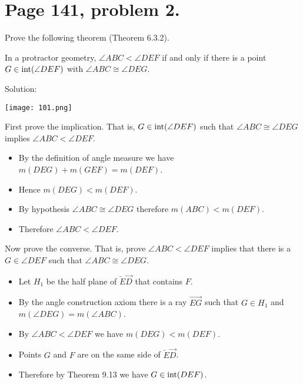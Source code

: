 \documentclass[12pt,openany]{report}
\begin{document}
\section*{Page 141, problem 2.}

Prove the following theorem (Theorem 6.3.2).

\medskip
\noindent
In a protractor geometry, $\angle ABC<\angle DEF$ if and only if
there is a point $G\in\mathop{\rm int}(\angle DEF)$ with
$\angle ABC\cong\angle DEG$.

\bigskip
\noindent
Solution:

\texttt{[image: 101.png]}

\medskip
\noindent
First prove the implication.
That is, $G\in\mathop{\rm int}(\angle DEF)$ such that 
$\angle ABC\cong\angle DEG$ implies $\angle ABC<\angle DEF$.

\begin{itemize}

\item[]
By the definition of angle measure we have
$m(DEG)+m(GEF)=m(DEF)$.

\item[]
Hence $m(DEG)<m(DEF)$.

\item[]
By hypothesis $\angle ABC\cong\angle DEG$ therefore $m(ABC)<m(DEF)$.

\item[]
Therefore $\angle ABC<\angle DEF$.

\end{itemize}

\noindent
Now prove the converse.
That is, prove $\angle ABC<\angle DEF$ implies that there is a $G\in\angle DEF$
such that $\angle ABC\cong\angle DEG$.

\begin{itemize}

\item[]
Let $H_1$ be the half plane of $\overleftarrow E\overrightarrow D$ that contains $F$.

\item[]
By the angle construction axiom there is a ray $\overrightarrow{EG}$ such
that $G\in H_1$ and $m(\angle DEG)=m(\angle ABC)$.

\item[]
By $\angle ABC<\angle DEF$ we have $m(DEG)<m(DEF)$.

\item[]
Points $G$ and $F$ are on the same side of $\overleftarrow E\overrightarrow D$.

\item[]
Therefore by Theorem 9.13 we have $G\in\mathop{\rm int}(DEF)$.

\end{itemize}
\end{document}
